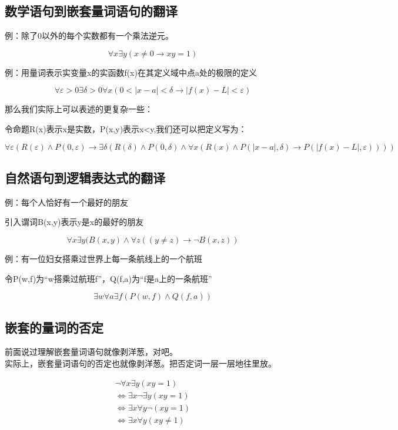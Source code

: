 \documentclass[12pt,a4paper,oneside]{ctexart}
\begin{document}
\subsection*{数学语句到嵌套量词语句的翻译}

例：除了0以外的每个实数都有一个乘法逆元。

\[\forall x\exists y(x\neq0\rightarrow xy=1)\]

例：用量词表示实变量x的实函数f(x)在其定义域中点a处的极限的定义

\[\forall\varepsilon>0\exists\delta>0\forall x(0<|x-a|<\delta\rightarrow|f(x)-L|<\varepsilon)\]

那么我们实际上可以表述的更复杂一些：

令命题R(x)表示x是实数，P(x,y)表示x\textless y,我们还可以把定义写为：

\[\forall\varepsilon(R(\varepsilon)\wedge P(0,\varepsilon)\rightarrow\exists\delta(R(\delta)\wedge P(0,\delta)\wedge\forall x(R(x)\wedge P(|x-a|,\delta)\rightarrow P(|f(x)-L|,\varepsilon))))\]

\subsection*{自然语句到逻辑表达式的翻译}

例：每个人恰好有一个最好的朋友

引入谓词B(x,y)表示y是x的最好的朋友

\[\forall x\exists y(B(x,y)\wedge\forall z((y\neq z)\rightarrow\neg B(x,z))\]

例：有一位妇女搭乘过世界上每一条航线上的一个航班

令P(w,f)为``w搭乘过航班f''，Q(f,a)为``f是a上的一条航班''

\[\exists w\forall a\exists f(P(w,f)\wedge Q(f,a))\]

\subsection*{嵌套的量词的否定}

前面说过理解嵌套量词语句就像剥洋葱，对吧。\\
实际上，嵌套量词语句的否定也就像剥洋葱。把否定词一层一层地往里放。

\[\begin{gathered}
\neg\forall x\exists y(xy=1)\\
\Leftrightarrow \exists x\neg \exists y(xy=1)\\
\Leftrightarrow \exists x\forall y\neg(xy=1)\\
\Leftrightarrow \exists x\forall y(xy\neq 1)
\end{gathered}\]
\end{document}
